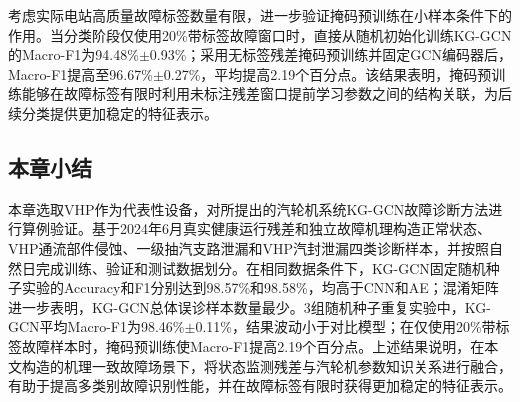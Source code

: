 考虑实际电站高质量故障标签数量有限，进一步验证掩码预训练在小样本条件下的作用。当分类阶段仅使用20\%带标签故障窗口时，直接从随机初始化训练KG-GCN的Macro-F1为94.48\%$\pm$0.93\%；采用无标签残差掩码预训练并固定GCN编码器后，Macro-F1提高至96.67\%$\pm$0.27\%，平均提高2.19个百分点。该结果表明，掩码预训练能够在故障标签有限时利用未标注残差窗口提前学习参数之间的结构关联，为后续分类提供更加稳定的特征表示。

\subsection{本章小结}

本章选取VHP作为代表性设备，对所提出的汽轮机系统KG-GCN故障诊断方法进行算例验证。基于2024年6月真实健康运行残差和独立故障机理构造正常状态、VHP通流部件侵蚀、一级抽汽支路泄漏和VHP汽封泄漏四类诊断样本，并按照自然日完成训练、验证和测试数据划分。在相同数据条件下，KG-GCN固定随机种子实验的Accuracy和F1分别达到98.57\%和98.58\%，均高于CNN和AE；混淆矩阵进一步表明，KG-GCN总体误诊样本数量最少。3组随机种子重复实验中，KG-GCN平均Macro-F1为98.46\%$\pm$0.11\%，结果波动小于对比模型；在仅使用20\%带标签故障样本时，掩码预训练使Macro-F1提高2.19个百分点。上述结果说明，在本文构造的机理一致故障场景下，将状态监测残差与汽轮机参数知识关系进行融合，有助于提高多类别故障识别性能，并在故障标签有限时获得更加稳定的特征表示。